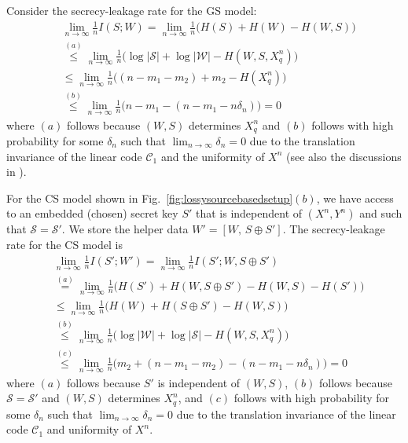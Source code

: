 \documentclass[journal,10pt,twoside]{IEEEtran}
\newcommand*\xor{\mathbin{\oplus}}
\begin{document}
Consider the secrecy-leakage rate for the GS model:
\begin{align}
&\lim_{n\rightarrow\infty}\frac{1}{n}I(S;W)\! =\! \lim_{n\rightarrow\infty}\frac{1}{n}\!\big(H(S)\!+\!H(W)\!-\!H(W,S)\big)\nonumber\\
&\overset{(a)}{\leq}\lim_{n\rightarrow\infty} \frac{1}{n}\big(\log|\mathcal{S}|+\log|\mathcal{W}|-H(W,S, X_q^n)\big)\nonumber\\
&\leq\lim_{n\rightarrow\infty} \frac{1}{n}\big((n-m_1-m_2)+m_2-H(X_q^n)\big)\nonumber\\
&\overset{(b)}{\leq}\lim_{n\rightarrow\infty} \frac{1}{n}\big(n-m_1-(n-m_1-n\delta_n)\big)=0\label{eq:secrecyleakconstruction}
\end{align}
where $(a)$ follows because $(W,S)$ determines $X_q^n$ and $(b)$ follows with high probability for some $\delta_n$ such that $\lim_{n\rightarrow\infty}\delta_n=0$ due to the translation invariance of the linear code $\mathcal{C}_1$ and the uniformity of $X^n$ (see also the discussions in \cite[Section I]{GuruswamiListDec}).

For the CS model shown in Fig.~\ref{fig:lossysourcebasedsetup}$(b)$, we have access to an embedded (chosen) secret key $S'$ that is independent of $(X^n,Y^n)$ and such that $\mathcal{S}=\mathcal{S}'$. We store the helper data $W' = [W,\, S\xor S']$. The secrecy-leakage rate for the CS model is 
\begin{align}
&\lim_{n\rightarrow\infty}\frac{1}{n}I(S';W')= \lim_{n\rightarrow\infty}\frac{1}{n}I(S';W,S\xor S')\nonumber\\
&\overset{(a)}{=}\lim_{n\rightarrow\infty}\frac{1}{n}\Big(H(S')+H(W,S\xor S')-H(W,S)-H(S')\Big)\nonumber\\
&\leq\lim_{n\rightarrow\infty}\frac{1}{n}\Big(H(W)+H(S\xor S')-H(W,S)\Big)\nonumber\\
&\overset{(b)}{\leq}\lim_{n\rightarrow\infty} \frac{1}{n}\big(\log|\mathcal{W}|+\log|\mathcal{S}|-H(W,S, X_q^n)\big)\nonumber\\
&\overset{(c)}{\leq}\!\lim_{n\rightarrow\infty}\frac{1}{n}\!\big(m_2+(n\!-\!m_1\!-\!m_2)-(n\!-\!m_1\!-\!n\delta_n)\big)\!=\!0
\label{eq:secrecyleakconstructionCS}
\end{align}
where $(a)$ follows because $S'$ is independent of $(W,S)$, $(b)$ follows because $\mathcal{S}=\mathcal{S}'$ and $(W,S)$ determines $X_q^n$, and $(c)$ follows with high probability for some $\delta_n$ such that $\lim_{n\rightarrow\infty}\delta_n=0$ due to the translation invariance of the linear code $\mathcal{C}_1$ and uniformity of $X^n$.
\end{document}
